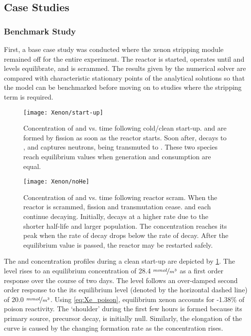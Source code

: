 \subsection{Case Studies}
\subsubsection{Benchmark Study}

First, a base case study was conducted where the xenon stripping module remained off for the entire experiment. The reactor is started, operates until \I and \Xe levels equilibrate, and is scrammed. The results given by the numerical solver are compared with characteristic stationary points of the analytical solutions so that the model can be benchmarked before moving on to studies where the stripping term is required.

\begin{figure}[b!]
    \centering
    \texttt{[image: Xenon/start-up]}
    \caption[Concentration of \I and \Xe vs. time following start-up]{Concentration of \I and \Xe vs. time following cold/clean start-up. \I and \Xe are formed by fission as soon as the reactor starts. Soon after, \I decays to \Xe, and \Xe captures neutrons, being transmuted to \Xe[136]. These two species reach equilibrium values when generation and consumption are equal.}
    \label{fig:startup}
\end{figure}

\begin{figure}[ht!]
    \centering
    \texttt{[image: Xenon/noHe]}
    \caption[Concentration of \I and \Xe vs. time following reactor scram]{Concentration of \I and \Xe vs. time following reactor scram. When the reactor is scrammed, fission and transmutation cease. \I and \Xe each continue decaying. Initially, \I decays at a higher rate due to the shorter half-life and larger population. The \Xe concentration reaches its peak when the rate of \I decay drops below the rate of \Xe decay. After the equilibrium value is passed, the reactor may be restarted safely.}
    \label{fig:Control}
\end{figure}

The \Xe and \I concentration profiles during a clean start-up are depicted by \cref{fig:startup}. The \I level rises to an equilibrium concentration of 28.4 $\nicefrac{mmol}{m^3}$ as a first order response over the course of two days. The \Xe level follows an over-damped second order response to the its equilibrium level (denoted by the horizontal dashed line) of 20.0 $\nicefrac{mmol}{m^3}$. Using \ref{eq:Xe_poison}, equilibrium xenon accounts for -1.38\% of poison reactivity. The `shoulder' during the first few hours is formed because its primary source, precursor decay, is initially null. Similarly, the elongation of the curve is caused by the changing formation rate as the \I concentration rises. 

